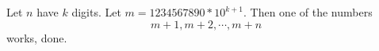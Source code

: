 Let $n$ have $k$ digits. Let $m=1234567890*10^{k+1}$.
Then one of the numbers
$$m+1, m+2, \cdots, m+n$$
works, done.
